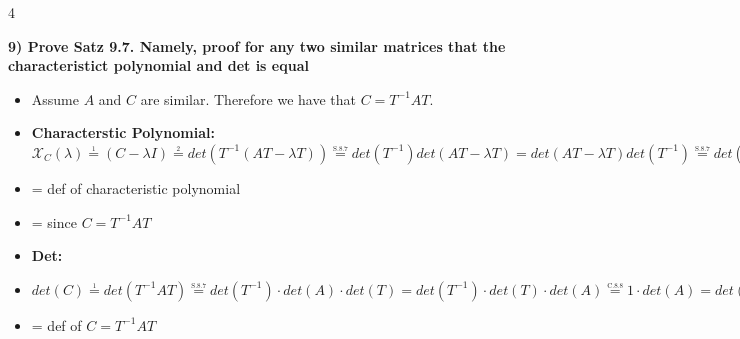 \documentclass[7pt,landscape, margin = 0.1mm]{article}
\begin{document}
\begin{multicols}{4}
\begin{flushleft}
\textbf{9) Prove Satz 9.7. Namely, proof for any two similar matrices that the characteristict polynomial and det is equal}
\begin{itemize}
\item[] Assume $A$ and $C$ are similar. Therefore we have that $C = T^{-1} A T$.
\item[] \textbf{Characterstic Polynomial:} $\mathcal{X}_{C}(\lambda) \overset{\underset{\mathrm{1}}{}}{=} (C - \lambda I)\overset{\underset{\mathrm{2}}{}}{=} det(T^{-1}(AT-\lambda T))\overset{\underset{\mathrm{S.8.7}}{}}{=} det(T^{-1})det(AT-\lambda T) =det(AT-\lambda T) det(T^{-1}) \overset{\underset{\mathrm{S.8.7}}{}}{=} det((AT-\lambda T)T^{-1}) = det(ATT^{-1}-\lambda T T^{-1}) = det (A - \lambda I) \overset{\underset{\mathrm{1}}{}}{=} \mathcal{X}_{A} (\lambda) $
\item[1] = def of characteristic polynomial
\item[2] = since  $C=T^{-1}AT $
\item[] \textbf{Det:}
\item[] $det(C) \overset{\underset{\mathrm{1}}{}}{=} det(T^{-1}AT) \overset{\underset{\mathrm{S.8.7}}{}}{=} det (T^{-1})\cdot  det(A) \cdot det(T) = det (T^{-1}) \cdot det(T) \cdot  det(A) \overset{\underset{\mathrm{C.8.8}}{}}{=} 1 \cdot det (A) = det (A) $
\item[1] = def of $C=T^{-1}AT$ 
\end{itemize}



\end{flushleft}
\end{multicols}
\end{document}
